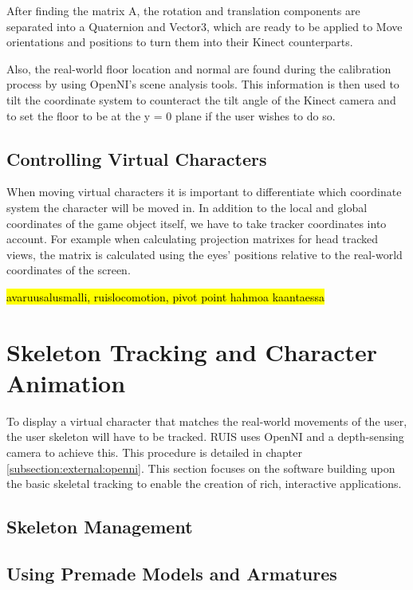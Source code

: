 \documentclass[12pt,a4paper,oneside,pdftex]{report}
\begin{document}
After finding the matrix A, the rotation and translation components are separated into a Quaternion and Vector3, which are ready to be applied to Move orientations and positions to turn them into their Kinect counterparts.

Also, the real-world floor location and normal are found during the calibration process by using OpenNI's scene analysis tools. This information is then used to tilt the coordinate system to counteract the tilt angle of the Kinect camera and to set the floor to be at the y = 0 plane if the user wishes to do so.

\subsection{Controlling Virtual Characters}
\label{subsection:coordinatesystems:virtualcharacters}

When moving virtual characters it is important to differentiate which coordinate system the character will be moved in. In addition to the local and global coordinates of the game object itself, we have to take tracker coordinates into account. For example when calculating projection matrixes for head tracked views, the matrix is calculated using the eyes' positions relative to the real-world coordinates of the screen. 

\hl{avaruusalusmalli, ruislocomotion, pivot point hahmoa kaantaessa}

\section{Skeleton Tracking and Character Animation}
\label{section:skeletontracking}

To display a virtual character that matches the real-world movements of the user, the user skeleton will have to be tracked. RUIS uses OpenNI and a depth-sensing camera to achieve this. This procedure is detailed in chapter \ref{subsection:external:openni}. This section focuses on the software building upon the basic skeletal tracking to enable the creation of rich, interactive applications. 

\subsection{Skeleton Management}
\label{subsection:skeletontracking:skeletonmanagement}

\subsection{Using Premade Models and Armatures}
\label{subsection:skeletontracking:premademodels}
\end{document}
